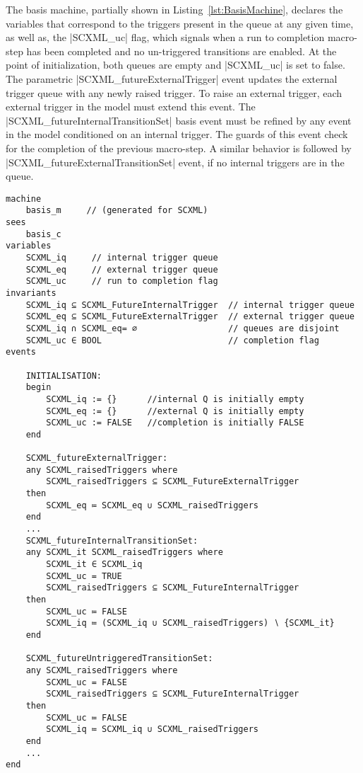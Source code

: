 The basis machine, partially shown in Listing~\ref{lst:BasisMachine}, declares the variables that correspond to the triggers present in the queue at any given time, as well as, the |SCXML_uc| flag, which signals when a run to completion macro-step has been completed and no un-triggered transitions are enabled. 
At the point of initialization, both queues are empty and |SCXML_uc| is set to false. 
The parametric |SCXML_futureExternalTrigger| event updates the external trigger queue with any newly raised trigger. 
To raise an external trigger, each external trigger in the model must extend this event.   
The |SCXML_futureInternalTransitionSet| basis event must be refined by any event in the model conditioned on an internal trigger. 
The guards of this event check for the completion of the previous macro-step. 
A similar behavior is followed by |SCXML_futureExternalTransitionSet| event, if no internal triggers are in the queue.  


\begin{lstlisting}[caption={Snippet of abstract basis machine}, label={lst:BasisMachine},language=Event-B, escapechar=|, frame=single]
machine
	basis_m 	// (generated for SCXML)
sees
	basis_c 
variables
	SCXML_iq	 // internal trigger queue
	SCXML_eq	 // external trigger queue
	SCXML_uc	 // run to completion flag
invariants
	SCXML_iq ⊆ SCXML_FutureInternalTrigger	// internal trigger queue
	SCXML_eq ⊆ SCXML_FutureExternalTrigger	// external trigger queue
	SCXML_iq ∩ SCXML_eq= ∅					// queues are disjoint
	SCXML_uc ∈ BOOL							// completion flag
events

	INITIALISATION: 
	begin
		SCXML_iq := {}		//internal Q is initially empty
		SCXML_eq := {}		//external Q is initially empty
		SCXML_uc := FALSE	//completion is initially FALSE
	end

	SCXML_futureExternalTrigger: 
	any SCXML_raisedTriggers where
		SCXML_raisedTriggers ⊆ SCXML_FutureExternalTrigger 
	then
		SCXML_eq ≔ SCXML_eq ∪ SCXML_raisedTriggers 
	end
	...
	SCXML_futureInternalTransitionSet: 
	any SCXML_it SCXML_raisedTriggers where
		SCXML_it ∈ SCXML_iq 
		SCXML_uc = TRUE 
		SCXML_raisedTriggers ⊆ SCXML_FutureInternalTrigger 
	then
		SCXML_uc ≔ FALSE 
		SCXML_iq ≔ (SCXML_iq ∪ SCXML_raisedTriggers) ∖ {SCXML_it} 
	end

	SCXML_futureUntriggeredTransitionSet: 
	any SCXML_raisedTriggers where
		SCXML_uc = FALSE
		SCXML_raisedTriggers ⊆ SCXML_FutureInternalTrigger
	then
		SCXML_uc ≔ FALSE 
		SCXML_iq ≔ SCXML_iq ∪ SCXML_raisedTriggers 
	end
	...
end
\end{lstlisting}


